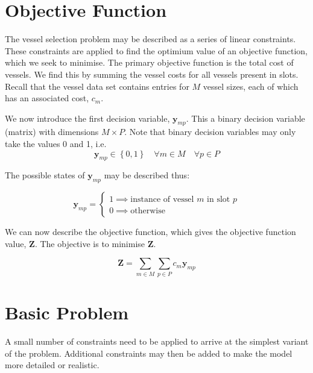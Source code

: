 \section{Objective Function}\label{S.objfn}

The vessel selection problem may be described as a series of linear constraints.
These constraints are applied to find the optimium value of an objective
function, which we seek to minimise.
The primary objective function is the total cost of vessels.
We find this by summing the vessel costs for all vessels present in slots.
Recall that the vessel data set contains entries for $M$ vessel sizes, each
of which has an associated cost, $c_{m}$.

We now introduce the first decision variable, $\boldsymbol{y}_{mp}$.
This a binary decision variable (matrix) with dimensions $M \times P$.
Note that binary decision variables may only take the values 0 and 1, i.e.
\begin{equation}
    \boldsymbol{y}_{mp} \in \left\{ 0, 1 \right\} \quad \forall m \in M \quad
    \forall p \in P
\end{equation}

The possible states of $\boldsymbol{y}_{mp}$ may be described thus:

\begin{equation}
    \boldsymbol{y}_{mp} =
    \begin{cases}
        1 \implies \text{instance of vessel $m$ in slot $p$}\\
        0 \implies \text{otherwise}
    \end{cases}
\end{equation}

We can now describe the objective function, which gives the objective function
value, $\boldsymbol{Z}$.  The objective is to minimise $\boldsymbol{Z}$.

\begin{equation}
    \boldsymbol{Z} = \sum_{m \in M} \sum_{p \in P} c_m \boldsymbol{y}_{mp}
\end{equation} 

\section{Basic Problem}\label{S.basicprob}

A small number of constraints need to be applied to arrive at the simplest 
variant of the problem.
Additional constraints may then be added to make the model more detailed or
realistic.

